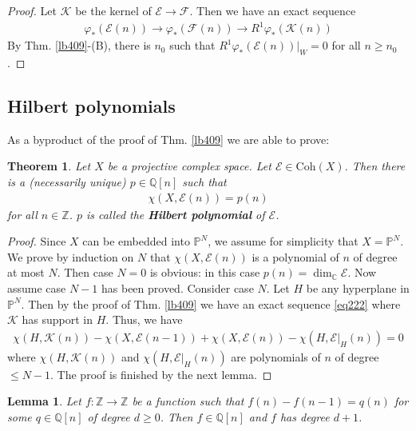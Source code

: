 \documentclass[12pt,b5paper,notitlepage]{report}
\theoremstyle{definition}
\theoremstyle{plain}
\newtheorem{thm}[df]{Theorem}
\newtheorem{lm}[df]{Lemma}
\newcommand{\scr}{\mathscr}
\newcommand{\Cbb}{\mathbb C}
\newcommand{\Zbb}{\mathbb Z}
\newcommand{\Pbb}{\mathbb P}
\newcommand{\Coh}{\mathrm{Coh}}
\newcommand{\Qbb}{\mathbb Q}
\numberwithin{equation}{section}
\begin{document}
\begin{proof}
Let $\scr K$ be the kernel of $\scr E\rightarrow\scr F$. Then we have an exact sequence
\begin{align*}
\varphi_*(\scr E(n))\rightarrow \varphi_*(\scr F(n))\rightarrow R^1\varphi_*(\scr K(n))
\end{align*}
By Thm. \ref{lb409}-(B), there is $n_0$ such that  $R^1\varphi_*(\scr E(n))|_W=0$ for all $n\geq n_0$.  
\end{proof}




\subsection{Hilbert polynomials}



As a byproduct of the proof of Thm. \ref{lb409} we are able to prove:



\begin{thm}\label{lb417}
Let $X$ be a projective complex space. Let $\scr E\in\Coh(X)$. Then there is a (necessarily unique) $p\in\Qbb[n]$ such that
\begin{align}
\chi(X,\scr E(n))=p(n)
\end{align}
for all $n\in\Zbb$. $p$ is called the \textbf{Hilbert polynomial}  of $\scr E$.
\end{thm}


\begin{proof}
Since $X$ can be embedded into $\Pbb^N$, we assume for simplicity that $X=\Pbb^N$. We prove by induction on $N$ that $\chi(X,\scr E(n))$ is a polynomial of $n$ of degree at most $N$. Then case $N=0$ is obvious: in this case $p(n)=\dim_\Cbb\scr E$. Now assume case $N-1$ has been proved. Consider case $N$. Let $H$ be any hyperplane in $\Pbb^N$. Then by the proof of Thm. \ref{lb409} we have an exact sequence \eqref{eq222} where $\scr K$ has support in $H$. Thus, we have
\begin{align*}
\chi(H,\scr K(n))-\chi(X,\scr E(n-1))+\chi(X,\scr E(n))-\chi(H,\scr E|_H(n))=0
\end{align*}
where $\chi(H,\scr K(n))$ and $\chi(H,\scr E|_H(n))$ are polynomials of $n$ of degree $\leq N-1$. The proof is finished by the next lemma.
\end{proof}




\begin{lm}
Let $f:\Zbb\rightarrow\Zbb$ be a function such that $f(n)-f(n-1)=q(n)$ for some $q\in\Qbb[n]$ of degree $d\geq0$. Then $f\in\Qbb[n]$ and $f$ has degree $d+1$. 
\end{lm}
\end{document}
